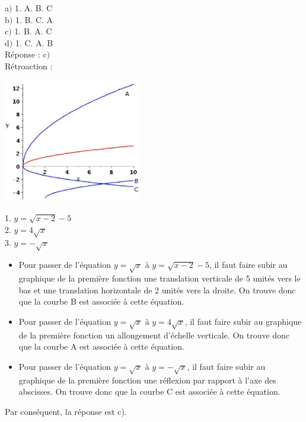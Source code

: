 \documentclass[letterpaper, 12pt]{article}
\begin{document}
a$)$ 1. A. B. C \\
b$)$ 1. B. C. A \\
c$)$ 1. B. A. C \\
d$)$ 1. C. A. B \\

R\'eponse : c$)$\\

R\'etroaction :
\begin{center}
 \includegraphics[width=6cm,bb=14 14 465 415]{Q2136.eps}
\end{center}
1. $y=\sqrt{x-2}-5$\\
2. $y=4\sqrt{x}$\\
3. $y=-\sqrt{x}$\\
\begin{itemize}
 \item Pour passer de l'\'equation $y=\sqrt{x}$ \`a $y=\sqrt{x-2}-5$, il faut faire subir au graphique de la premi\`ere fonction une translation verticale de 5 unit\'es vers le bas et une translation horizontale de 2 unit\'es vers la droite. On trouve donc que la courbe B est associ\'ee \`a cette \'equation.
\item Pour passer de l'\'equation $y=\sqrt{x}$ \`a $y=4\sqrt{x}$, il faut faire subir au graphique de la premi\`ere fonction un allongement d'\'echelle verticale. On trouve donc que la courbe A est associ\'ee \`a cette \'equation.
\item Pour passer de l'\'equation $y=\sqrt{x}$ \`a $y=-\sqrt{x}$, il faut faire subir au graphique de la premi\`ere fonction une r\'eflexion par rapport \`a l'axe des abscisses. On trouve donc que la courbe C est associ\'ee \`a cette \'equation.
\end{itemize}
Par cons\'equent, la r\'eponse est c).\\
\end{document}
